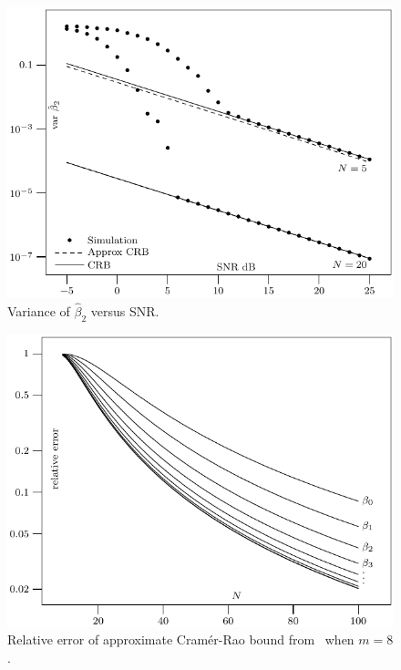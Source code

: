 \documentclass[review]{elsarticle}
\begin{document}
 \begin{figure}[p]
    	\centering 
   		\includegraphics{fig3.pdf} 
    		\caption{Variance of $\hat{\beta}_2$ versus SNR.} 
    		\label{plot:phase2} 
 \end{figure}  
 
\clearpage

 \begin{figure}[p]
    	\centering 
   		\includegraphics{fig4.pdf} 
    		\caption{Relative error of approximate Cram\'{e}r-Rao bound from~\cite{Peleg1991_CRB_PPS_1991} when $m=8$.} 
    		\label{plot:relerror} 
 \end{figure}
\end{document}
